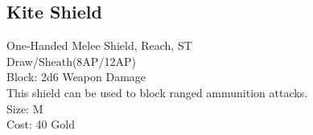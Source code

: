 \subsection{Kite Shield}\label{weapon:kiteShield}
One-Handed Melee Shield,  Reach, ST\\
Draw/Sheath(8AP/12AP)\\
Block: 2d6 Weapon Damage\\
This shield can be used to block ranged ammunition attacks.\\
Size: M\\
Cost: 40 Gold\\